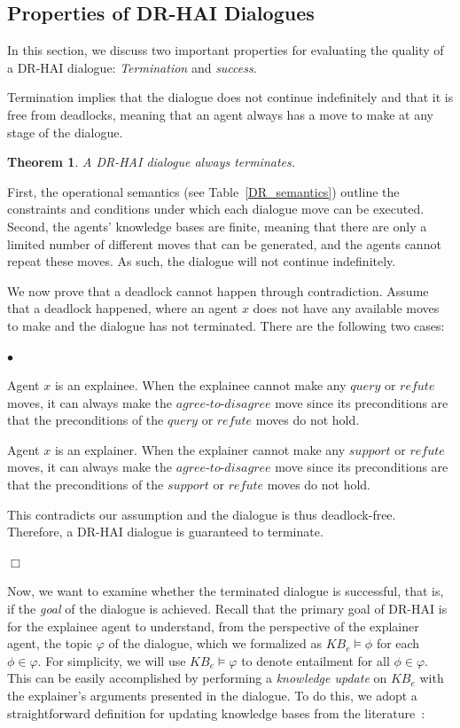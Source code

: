 \documentclass{ecai}
\newtheorem{theorem}{{\bf Theorem}}
\newenvironment{skproof}{\noindent {\sc Proof (sketch).}}{\hfill$\Box$}
\newcommand{\squishlist}{
\begin{list}{$\bullet$}{ 
    \setlength{\itemsep}{1pt}
    \setlength{\parsep}{0pt}
    \setlength{\topsep}{1.5pt}
    \setlength{\partopsep}{0pt}
    \setlength{\leftmargin}{1em}
    \setlength{\labelwidth}{1em}
    \setlength{\labelsep}{0.5em} } }
\newcommand{\squishend}{\end{list}  }
\begin{document}
\subsection{Properties of DR-HAI Dialogues}
\label{properties}



In this section, we discuss two important properties for evaluating the quality of a DR-HAI dialogue: \emph{Termination} and \emph{success}. 

Termination implies that the dialogue does not continue indefinitely and that it is free from deadlocks, meaning that an agent always has a move to make at any stage of the dialogue.

\begin{theorem}
    A DR-HAI dialogue always terminates.
    \label{term_theo}
\end{theorem}

\begin{skproof}
First, the operational semantics (see Table~\ref{DR_semantics}) outline the constraints and conditions under which each dialogue move can be executed. Second, the agents' knowledge bases are finite, meaning that there are only a limited number of different moves that can be generated, and the agents cannot repeat these moves. As such, the dialogue will not continue indefinitely. 


We now prove that a deadlock cannot happen through contradiction. Assume that a deadlock happened, where an agent $x$ does not have any available moves to make and the dialogue has not terminated. There are the following two cases:
\squishlist
\item Agent $x$ is an explainee. When the explainee cannot make any $query$ or $refute$ moves, it can always make the $agree$-$to$-$disagree$ move since its preconditions are that the preconditions of the $query$ or $refute$ moves do not hold. 
\item Agent $x$ is an explainer. When the explainer cannot make any $support$ or $refute$ moves, it can always make the $agree$-$to$-$disagree$ move since its preconditions are that the preconditions of the $support$ or $refute$ moves do not hold. 
\squishend
This contradicts our assumption and the dialogue is thus deadlock-free. Therefore, a DR-HAI dialogue is guaranteed to terminate.

\end{skproof}

\smallskip 
Now, we want to examine whether the terminated dialogue is successful, that is, if the \emph{goal} of the dialogue is achieved. Recall that the primary goal of DR-HAI is for the explainee agent to understand, from the perspective of the explainer agent, the topic $\varphi$ of the dialogue, which we formalized as $KB_e \models \phi$ for each $\phi \in \varphi$. For simplicity, we will use $KB_e \models \varphi$ to denote entailment for all $\phi \in \varphi$. This can be easily accomplished by performing a \emph{knowledge update} on $KB_e$ with the explainer's arguments presented in the dialogue. To do this, we adopt a straightforward definition for updating knowledge bases from the literature~\cite{vasileioulogic}:
\end{document}
